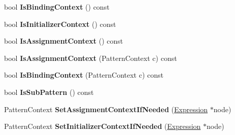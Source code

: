 \begin{DoxyCompactItemize}
\item 
bool {\bfseries Is\+Binding\+Context} () const \hypertarget{classv8_1_1internal_1_1_parser_1_1_pattern_rewriter_a092bc568da40af4e6042ca445b7e494d}{}\label{classv8_1_1internal_1_1_parser_1_1_pattern_rewriter_a092bc568da40af4e6042ca445b7e494d}

\item 
bool {\bfseries Is\+Initializer\+Context} () const \hypertarget{classv8_1_1internal_1_1_parser_1_1_pattern_rewriter_a4d63a8b56b61f841a31c79b880ca7dfa}{}\label{classv8_1_1internal_1_1_parser_1_1_pattern_rewriter_a4d63a8b56b61f841a31c79b880ca7dfa}

\item 
bool {\bfseries Is\+Assignment\+Context} () const \hypertarget{classv8_1_1internal_1_1_parser_1_1_pattern_rewriter_a400dcb4c298bdb4749acd3663f98a1d2}{}\label{classv8_1_1internal_1_1_parser_1_1_pattern_rewriter_a400dcb4c298bdb4749acd3663f98a1d2}

\item 
bool {\bfseries Is\+Assignment\+Context} (Pattern\+Context c) const \hypertarget{classv8_1_1internal_1_1_parser_1_1_pattern_rewriter_a1fc8d91803f2ee272ba361520aaf7ab1}{}\label{classv8_1_1internal_1_1_parser_1_1_pattern_rewriter_a1fc8d91803f2ee272ba361520aaf7ab1}

\item 
bool {\bfseries Is\+Binding\+Context} (Pattern\+Context c) const \hypertarget{classv8_1_1internal_1_1_parser_1_1_pattern_rewriter_a9f3ce4abd196d2f9ac95c63f8e607130}{}\label{classv8_1_1internal_1_1_parser_1_1_pattern_rewriter_a9f3ce4abd196d2f9ac95c63f8e607130}

\item 
bool {\bfseries Is\+Sub\+Pattern} () const \hypertarget{classv8_1_1internal_1_1_parser_1_1_pattern_rewriter_a4e4fc425f2ea06c9df86c62842e18b8b}{}\label{classv8_1_1internal_1_1_parser_1_1_pattern_rewriter_a4e4fc425f2ea06c9df86c62842e18b8b}

\item 
Pattern\+Context {\bfseries Set\+Assignment\+Context\+If\+Needed} (\hyperlink{classv8_1_1internal_1_1_expression}{Expression} $\ast$node)\hypertarget{classv8_1_1internal_1_1_parser_1_1_pattern_rewriter_ae38c8e42e310a267893c544ec9163409}{}\label{classv8_1_1internal_1_1_parser_1_1_pattern_rewriter_ae38c8e42e310a267893c544ec9163409}

\item 
Pattern\+Context {\bfseries Set\+Initializer\+Context\+If\+Needed} (\hyperlink{classv8_1_1internal_1_1_expression}{Expression} $\ast$node)\hypertarget{classv8_1_1internal_1_1_parser_1_1_pattern_rewriter_aec931b285736f5781099cb3d24077dbc}{}\label{classv8_1_1internal_1_1_parser_1_1_pattern_rewriter_aec931b285736f5781099cb3d24077dbc}


\end{DoxyCompactItemize}
